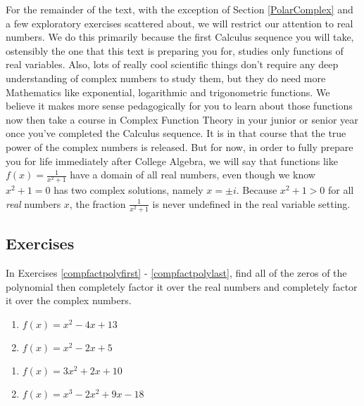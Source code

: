 For the remainder of the text, with the exception of Section \ref{PolarComplex} and a few exploratory exercises scattered about, we will restrict our attention to real numbers.  We do this primarily because the first Calculus sequence you will take, ostensibly the one that this text is preparing you for, studies only functions of real variables.  Also, lots of really cool scientific things don't require any deep understanding of complex numbers to study them, but they do need more Mathematics like exponential, logarithmic and trigonometric functions.  We believe it makes more sense pedagogically for you to learn about those functions now then take a course in Complex Function Theory in your junior or senior year once you've completed the Calculus sequence.  It is in that course that the true power of the complex numbers is released.  But for now, in order to fully prepare you for life immediately after College Algebra, we will say that functions like $f(x) = \frac{1}{x^{2} + 1}$ have a domain of all real numbers, even though we know $x^{2} + 1 = 0$ has two complex solutions, namely $x = \pm i$.  Because $x^{2} + 1 > 0$ for all \emph{real} numbers $x$, the fraction $\frac{1}{x^{2} + 1}$ is never undefined in the real variable setting.

\newpage

\subsection{Exercises}



In Exercises \ref{compfactpolyfirst} - \ref{compfactpolylast}, find all of the zeros of the polynomial then completely factor it over the real numbers and completely factor it over the complex numbers.

\begin{multicols}{2}
\begin{enumerate}
\setcounter{enumi}{\value{HW}}

\item $f(x) = x^{2} - 4x + 13$ \label{compfactpolyfirst}
\item $f(x) = x^2 - 2x + 5$

\setcounter{HW}{\value{enumi}}
\end{enumerate}
\end{multicols}

\begin{multicols}{2}
\begin{enumerate}
\setcounter{enumi}{\value{HW}}

\item $f(x) = 3x^{2} + 2x + 10$
\item $f(x) = x^3-2x^2+9x-18$

\setcounter{HW}{\value{enumi}}
\end{enumerate}
\end{multicols}

